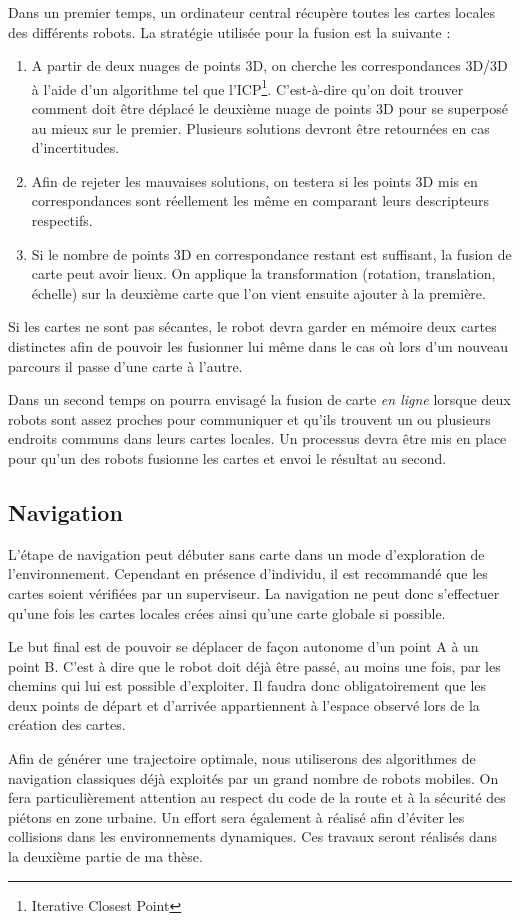 Dans un premier temps, un ordinateur central récupère toutes les cartes locales des différents robots.
La stratégie utilisée pour la fusion est la suivante :
\begin{enumerate}
\item A partir de deux nuages de points 3D, on cherche les correspondances 3D/3D à l'aide d'un algorithme tel que l'ICP\footnote{Iterative Closest Point}.
C'est-à-dire qu'on doit trouver comment doit être déplacé le deuxième nuage de points 3D pour se superposé au mieux sur le premier.
Plusieurs solutions devront être retournées en cas d'incertitudes.
\item Afin de rejeter les mauvaises solutions, on testera si les points 3D mis en correspondances sont réellement les même en comparant leurs descripteurs respectifs.
\item Si le nombre de points 3D en correspondance restant est suffisant, la fusion de carte peut avoir lieux.
On applique la transformation (rotation, translation, échelle) sur la deuxième carte que l'on vient ensuite ajouter à la première.
\end{enumerate}

Si les cartes ne sont pas sécantes, le robot devra garder en mémoire deux cartes distinctes afin de pouvoir les fusionner lui même dans le cas où lors d'un nouveau parcours il passe d'une carte à l'autre.

Dans un second temps on pourra envisagé la fusion de carte \emph{en ligne} lorsque deux robots sont assez proches pour communiquer et qu'ils trouvent un ou plusieurs endroits communs dans leurs cartes locales.
Un processus devra être mis en place pour qu'un des robots fusionne les cartes et envoi le résultat au second.

\subsection{Navigation}

L'étape de navigation peut débuter sans carte dans un mode d'exploration de l'environnement.
Cependant en présence d'individu, il est recommandé que les cartes soient vérifiées par un superviseur.
La navigation ne peut donc s'effectuer qu'une fois les cartes locales crées ainsi qu'une carte globale si possible.

Le but final est de pouvoir se déplacer de façon autonome d'un point A à un point B.
C'est à dire que le robot doit déjà être passé, au moins une fois, par les chemins qui lui est possible d'exploiter.
Il faudra donc obligatoirement que les deux points de départ et d'arrivée appartiennent à l'espace observé lors de la création des cartes.

Afin de générer une trajectoire optimale, nous utiliserons des algorithmes de navigation classiques déjà exploités par un grand nombre de robots mobiles.
On fera particulièrement attention au respect du code de la route et à la sécurité des piétons en zone urbaine.
Un effort sera également à réalisé afin d'éviter les collisions dans les environnements dynamiques.
Ces travaux seront réalisés dans la deuxième partie de ma thèse. 

